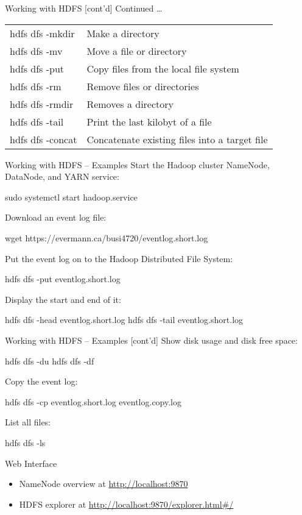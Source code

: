 \documentclass[ignorenonframetext,xcolor=x11names]{beamer}
\begin{document}
\begin{frame}{Working with HDFS \small [cont'd]}
Continued \ldots \\

\renewcommand{\arraystretch}{1.25}
\begin{tabular}{l|l} \hline
hdfs dfs -mkdir & Make a directory \\
hdfs dfs -mv & Move a file or directory \\
hdfs dfs -put & Copy files from the local file system \\
hdfs dfs -rm & Remove files or directories \\
hdfs dfs -rmdir & Removes a directory \\
hdfs dfs -tail & Print the last kilobyt of a file \\
hdfs dfs -concat & Concatenate existing files into a target file \\ \hline
\end{tabular}
\end{frame}


\begin{frame}[fragile]{Working with HDFS -- Examples}
Start the Hadoop cluster NameNode, DataNode, and YARN service:
\begin{bashcode}
sudo systemctl start hadoop.service
\end{bashcode}
Download an event log file:
\begin{bashcode}
wget https://evermann.ca/busi4720/eventlog.short.log
\end{bashcode}
Put the event log on to the Hadoop Distributed File System:
\begin{bashcode}
hdfs dfs -put eventlog.short.log
\end{bashcode}
Display the start and end of it:
\begin{bashcode}
hdfs dfs -head eventlog.short.log
hdfs dfs -tail eventlog.short.log
\end{bashcode}
\end{frame}

\begin{frame}[fragile]{Working with HDFS -- Examples \small [cont'd]}
Show disk usage and disk free space:
\begin{bashcode}
hdfs dfs -du
hdfs dfs -df
\end{bashcode}
Copy the event log:
\begin{bashcode}
hdfs dfs -cp eventlog.short.log eventlog.copy.log
\end{bashcode}
List all files:
\begin{bashcode}
hdfs dfs -ls
\end{bashcode}
\begin{block}{Web Interface}
\begin{itemize}
\item NameNode overview at \url{http://localhost:9870}
\item HDFS explorer at \url{http://localhost:9870/explorer.html#/}
\end{itemize}
\end{block}
\end{frame}
\end{document}
